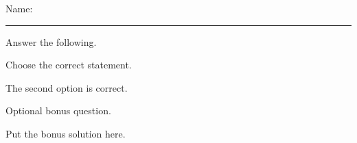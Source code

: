 \documentclass{ximera}
\begin{document}
\begin{examcover}
  \examcoverheading{\examtitletext}

  \medskip
  \noindent
  \examcoursetext
  \hfill
  \examversiontext
  \par

  \medskip
  \noindent
  \examdatetext
  \par

  \bigskip
  \noindent
  Name: \rule{3in}{0.4pt}

  \bigskip
  \begin{center}
    \gradetable[h][noearned][4]
  \end{center}
\end{examcover}

\begin{questions}

  \question
  Answer the following.


  \newpage

  \question[4]
  Choose the correct statement.

  \begin{multipleChoice}[layout=horizontal,max-per-row=3]
  \end{multipleChoice}

  \begin{solution}[1in]
    The second option is correct.
  \end{solution}

  \bonusquestion[2]
  Optional bonus question.

  \begin{solution}[1in]
    Put the bonus solution here.
  \end{solution}

\end{questions}
\end{document}
